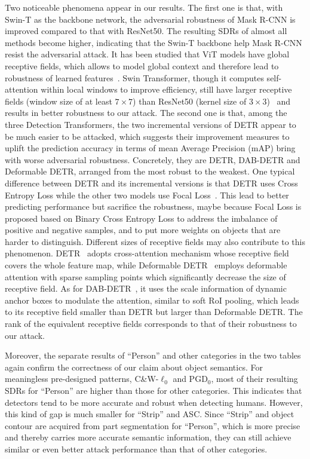 \documentclass[times,twocolumn,final,authoryear]{elsarticle}
\begin{document}
Two noticeable phenomena appear in our results. The first one is that, with Swin-T as the backbone network, the adversarial robustness of Mask R-CNN is improved compared to that with ResNet50. The resulting SDRs of almost all methods become higher, indicating that the Swin-T backbone help Mask R-CNN resist the adversarial attack. It has been studied that ViT models have global receptive fields, which allows to model global context and therefore lead to robustness of learned features~\citep{naseer2021intriguing}. Swin Transformer, though it computes self-attention within local windows to improve efficiency, still have larger receptive fields (window size of at least $7\times7$) than ResNet50 (kernel size of $3\times3$)~\citep{liu2022convnet} and results in better robustness to our attack. The second one is that, among the three Detection Transformers, the two incremental versions of DETR appear to be much easier to be attacked, which suggests their improvement measures to uplift the prediction accuracy in terms of mean Average Precision (mAP) bring with worse adversarial robustness. Concretely, they are DETR, DAB-DETR and Deformable DETR, arranged from the most robust to the weakest. One typical difference between DETR and its incremental versions is that DETR uses Cross Entropy Loss while the other two models use Focal Loss~\citep{lin2017focal}. This lead to better predicting performance but sacrifice the robustness, maybe because Focal Loss is proposed based on Binary Cross Entropy Loss to address the imbalance of positive and negative samples, and to put more weights on objects that are harder to distinguish. Different sizes of receptive fields may also contribute to this phenomenon. DETR~\citep{carion2020detr} adopts 
cross-attention mechanism whose receptive field covers the whole feature map, while Deformable DETR~\citep{zhu2020deformable} employs deformable attention with sparse sampling points which significantly decrease the size of receptive field. As for DAB-DETR~\citep{liu2022dabdetr}, it uses the scale information of dynamic anchor boxes to modulate the attention, similar to soft RoI pooling, which leads to its receptive field smaller than DETR but larger than Deformable DETR. The rank of the equivalent receptive fields corresponds to that of their robustness to our attack.


Moreover, the separate results of ``Person'' and other categories in the two tables again confirm the correctness of our claim about object semantics. For meaningless pre-designed patterns, C\&W-$\ell_0$ and PGD$_0$, most of their resulting SDRs for ``Person'' are higher than those for other categories. This indicates that detectors tend to be more accurate and robust when detecting humans. However, this kind of gap is much smaller for ``Strip'' and ASC. Since ``Strip'' and object contour are acquired from part segmentation for ``Person'', which is more precise and thereby carries more accurate semantic information, they can still achieve similar or even better attack performance than that of other categories.
\end{document}
